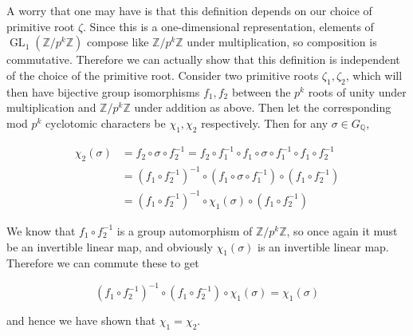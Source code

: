 \documentclass{article}
\theoremstyle{definition}
\theoremstyle{definition}
\theoremstyle{definition}
\newcommand{\Z}{\mathbb{Z}}
\newcommand{\Q}{\mathbb{Q}}
\begin{document}
A worry that one may have is that this definition depends on our choice of primitive root $\zeta$. Since this is a one-dimensional representation, elements of $\operatorname{GL}_1(\Z/p^k\Z)$ compose like $\Z/p^k\Z$ under multiplication, so composition is commutative. Therefore we can actually show that this definition is independent of the choice of the primitive root. Consider two primitive roots $\zeta_1,\zeta_2$, which will then have bijective group isomorphisms $f_1,f_2$ between the $p^k$ roots of unity under multiplication and $\Z/p^k\Z$ under addition as above. Then let the corresponding mod $p^k$ cyclotomic characters be $\chi_1,\chi_2$ respectively. Then for any $\sigma\in G_\Q$,

\begin{align*}
\chi_2(\sigma)&=f_2\circ\sigma\circ f_2^{-1}=f_2\circ f_1^{-1}\circ f_1\circ\sigma\circ f_1^{-1}\circ f_1\circ f_2^{-1}\\&=\left(f_1\circ f_2^{-1}\right)^{-1}\circ\left(f_1\circ\sigma\circ f_1^{-1}\right)\circ\left(f_1\circ f_2^{-1}\right)\\&=\left(f_1\circ f_2^{-1}\right)^{-1}\circ\chi_1(\sigma)\circ\left(f_1\circ f_2^{-1}\right)
\end{align*}

We know that $f_1\circ f_2^{-1}$ is a group automorphism of $\Z/p^k\Z$, so once again it must be an invertible linear map, and obviously $\chi_1(\sigma)$ is an invertible linear map. Therefore we can commute these to get

$$\left(f_1\circ f_2^{-1}\right)^{-1}\circ\left(f_1\circ f_2^{-1}\right)\circ\chi_1(\sigma)=\chi_1(\sigma)$$

and hence we have shown that $\chi_1=\chi_2$.
\end{document}
